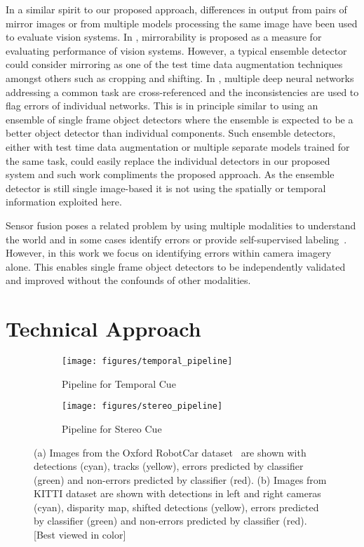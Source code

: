 \documentclass[letterpaper, 10 pt, journal, twoside]{IEEEtran}  %
\begin{document}
In a similar spirit to our proposed approach, differences in output from pairs of mirror images \cite{yang2015mirror} or from multiple models processing the same image \cite{pei2017deepxplore} have been used to evaluate vision systems.  In \cite{yang2015mirror}, mirrorability is proposed as a measure for evaluating performance of vision systems. However, a typical ensemble detector could consider mirroring as one of the test time data augmentation techniques amongst others such as cropping and shifting. In \cite{pei2017deepxplore}, multiple deep neural networks addressing a common task are cross-referenced and the inconsistencies are used to flag errors of individual networks. This is in principle similar to using an ensemble of single frame object detectors where the ensemble is expected to be a better object detector than individual components. Such ensemble detectors, either with test time data augmentation or multiple separate models trained for the same task, could easily replace the individual detectors in our proposed system and such work compliments the proposed approach. As the ensemble detector is still single image-based it is not using the spatially or temporal information exploited here. 

Sensor fusion poses a related problem by using multiple modalities to understand the world and in some cases identify errors or provide self-supervised labeling~\cite{barnes2017find}. However, in this work we focus on identifying errors within camera imagery alone. This enables single frame object detectors to be independently validated and improved without the confounds of other modalities. 


\section{Technical Approach}
\label{sec:methods}

\begin{figure*}[t]
    \centering
    \begin{subfigure}[t]{\linewidth}
        \texttt{[image: figures/temporal\_pipeline]}
        \caption{Pipeline for Temporal Cue}
        \label{fig:pipeline_temporal}
    \end{subfigure}
    \begin{subfigure}[t]{\linewidth}
        \texttt{[image: figures/stereo\_pipeline]}
        \caption{Pipeline for Stereo Cue}
        \label{fig:pipeline_stereo}
    \end{subfigure}
    \caption{(a) Images from the Oxford RobotCar dataset~\cite{maddern20171} are shown with detections (cyan), tracks (yellow), errors predicted by classifier (green) and non-errors predicted by classifier (red). (b) Images from KITTI dataset are shown with detections in left and right cameras (cyan), disparity map, shifted detections (yellow), errors predicted by classifier (green) and non-errors predicted by classifier (red). [Best viewed in color]}
\end{figure*}
\end{document}
